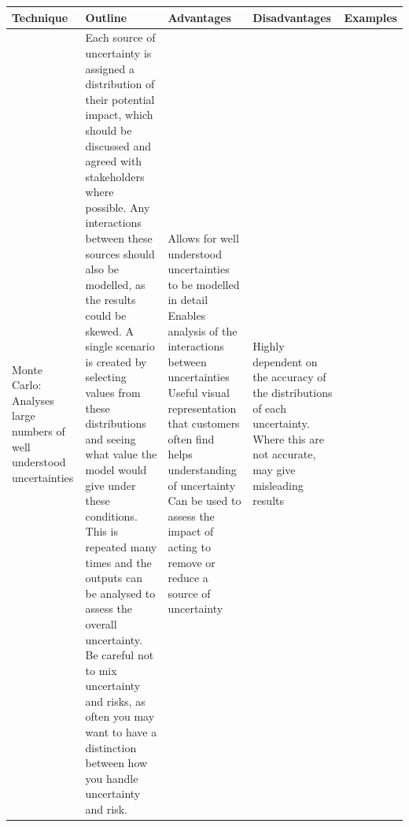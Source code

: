 \documentclass[]{book}
\begin{document}
\begin{longtable}[]{@{}lllll@{}}
\toprule
\begin{minipage}[b]{0.16\columnwidth}\raggedright\strut
Technique\strut
\end{minipage} & \begin{minipage}[b]{0.26\columnwidth}\raggedright\strut
Outline\strut
\end{minipage} & \begin{minipage}[b]{0.16\columnwidth}\raggedright\strut
Advantages\strut
\end{minipage} & \begin{minipage}[b]{0.16\columnwidth}\raggedright\strut
Disadvantages\strut
\end{minipage} & \begin{minipage}[b]{0.13\columnwidth}\raggedright\strut
Examples\strut
\end{minipage}\tabularnewline
\midrule
\endhead
\begin{minipage}[t]{0.16\columnwidth}\raggedright\strut
Monte Carlo: Analyses large numbers of well understood
uncertainties\strut
\end{minipage} & \begin{minipage}[t]{0.26\columnwidth}\raggedright\strut
Each source of uncertainty is assigned a distribution of their potential
impact, which should be discussed and agreed with stakeholders where
possible. Any interactions between these sources should also be
modelled, as the results could be skewed. A single scenario is created
by selecting values from these distributions and seeing what value the
model would give under these conditions. This is repeated many times and
the outputs can be analysed to assess the overall uncertainty. Be
careful not to mix uncertainty and risks, as often you may want to have
a distinction between how you handle uncertainty and risk.\strut
\end{minipage} & \begin{minipage}[t]{0.16\columnwidth}\raggedright\strut
Allows for well understood uncertainties to be modelled in detail
Enables analysis of the interactions between uncertainties Useful visual
representation that customers often find helps understanding of
uncertainty Can be used to assess the impact of acting to remove or
reduce a source of uncertainty\strut
\end{minipage} & \begin{minipage}[t]{0.16\columnwidth}\raggedright\strut
Highly dependent on the accuracy of the distributions of each
uncertainty. Where this are not accurate, may give misleading results

\end{minipage}
\end{longtable}
\end{document}
